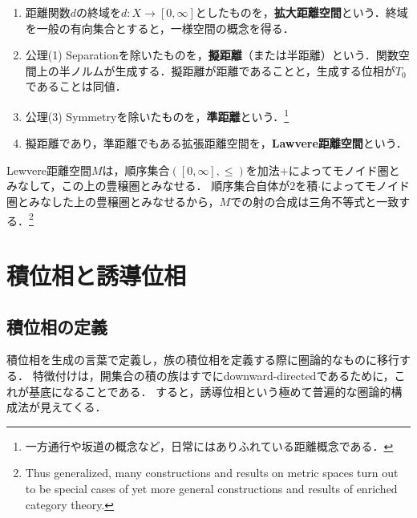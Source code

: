 \documentclass[uplatex,dvipdfmx]{jsreport}
\begin{document}
\begin{definition}\mbox{}
    \begin{enumerate}
        \item 距離関数$d$の終域を$d:X\to[0,\infty]$としたものを，\textbf{拡大距離空間}という．終域を一般の有向集合とすると，一様空間の概念を得る．
        \item 公理(1) Separationを除いたものを，\textbf{擬距離}（または半距離）という．関数空間上の半ノルムが生成する．擬距離が距離であることと，生成する位相が$T_0$であることは同値．
        \item 公理(3) Symmetryを除いたものを，\textbf{準距離}という．\footnote{一方通行や坂道の概念など，日常にはありふれている距離概念である．}
        \item 擬距離であり，準距離でもある拡張距離空間を，\textbf{Lawvere距離空間}という．
    \end{enumerate}
\end{definition}

\begin{lemma}
    Lewvere距離空間$M$は，順序集合$([0,\infty],\le)$を加法$+$によってモノイド圏とみなして，この上の豊穣圏とみなせる．
    順序集合自体が$2$を積$\cdot$によってモノイド圏とみなした上の豊穣圏とみなせるから，$M$での射の合成は三角不等式と一致する．\footnote{Thus generalized, many constructions and results on metric spaces turn out to be special cases of yet more general constructions and results of enriched category theory. }
\end{lemma}

\section{積位相と誘導位相}

\subsection{積位相の定義}

\begin{tcolorbox}[colframe=ForestGreen, colback=ForestGreen!10!white, breakable ,colbacktitle=ForestGreen!40!white, coltitle=black,fonttitle=\bfseries\sffamily
    ,title=積位相とは，開集合の積が$\cup$-生成するもの]
    積位相を生成の言葉で定義し，族の積位相を定義する際に圏論的なものに移行する．
    特徴付けは，開集合の積の族はすでにdownward-directedであるために，これが基底になることである．
    すると，誘導位相という極めて普遍的な圏論的構成法が見えてくる．
\end{tcolorbox}
\end{document}
